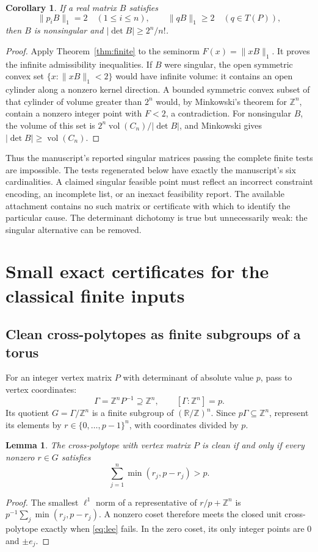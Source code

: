 \documentclass[11pt,reqno]{amsart}
\newtheorem{lemma}[theorem]{Lemma}
\newtheorem{corollary}[theorem]{Corollary}
\theoremstyle{definition}
\newcommand{\R}{\mathbb R}
\newcommand{\Z}{\mathbb Z}
\newcommand{\norm}[1]{\lVert #1\rVert_1}
\newcommand{\vol}{\operatorname{vol}}
\begin{document}
\begin{corollary}\label{cor:no-singular}
If a real matrix $B$ satisfies
\[
 \norm{p_iB}=2\quad(1\le i\le n),\qquad
 \norm{qB}\ge2\quad(q\in T(P)),
\]
then $B$ is nonsingular and
$|\det B|\ge2^n/n!$.
\end{corollary}
\begin{proof}
Apply Theorem~\ref{thm:finite} to the seminorm $F(x)=\norm{xB}$.
It proves the infinite admissibility inequalities. If $B$ were singular,
the open symmetric convex set $\{x:\norm{xB}<2\}$ would have infinite
volume: it contains an open cylinder along a nonzero kernel direction.
A bounded symmetric convex subset of that cylinder of volume greater
than $2^n$ would, by Minkowski's theorem for $\Z^n$, contain a nonzero
integer point with $F<2$, a contradiction. For nonsingular $B$, the
volume of this set is $2^n\vol(C_n)/|\det B|$, and Minkowski gives
$|\det B|\ge\vol(C_n)$.
\end{proof}

Thus the manuscript's reported singular matrices passing the complete
finite tests are impossible. The tests regenerated below have exactly
the manuscript's six cardinalities. A claimed singular feasible point
must reflect an incorrect constraint encoding, an incomplete list, or
an inexact feasibility report. The available attachment contains no
such matrix or certificate with which to identify the particular cause.
The determinant dichotomy is true but unnecessarily weak: the singular
alternative can be removed.

\section{Small exact certificates for the classical finite inputs}\label{sec:classification}
\subsection{Clean cross-polytopes as finite subgroups of a torus}
For an integer vertex matrix $P$ with determinant of absolute value $p$,
pass to vertex coordinates:
\[
 \Gamma=\Z^nP^{-1}\supseteq\Z^n,\qquad [\Gamma:\Z^n]=p.
\]
Its quotient $G=\Gamma/\Z^n$ is a finite subgroup of $(\R/\Z)^n$.
Since $p\Gamma\subseteq\Z^n$, represent its elements by
$r\in\{0,\ldots,p-1\}^n$, with coordinates divided by $p$.

\begin{lemma}\label{lem:torus}
The cross-polytope with vertex matrix $P$ is clean if and only if every
nonzero $r\in G$ satisfies
\begin{equation}\label{eq:lee}
 \sum_{j=1}^n\min(r_j,p-r_j)>p.
\end{equation}
\end{lemma}
\begin{proof}
The smallest $\ell^1$ norm of a representative of $r/p+\Z^n$ is
$p^{-1}\sum_j\min(r_j,p-r_j)$. A nonzero coset therefore meets the
closed unit cross-polytope exactly when \eqref{eq:lee} fails. In the
zero coset, its only integer points are $0$ and $\pm e_j$.
\end{proof}
\end{document}
